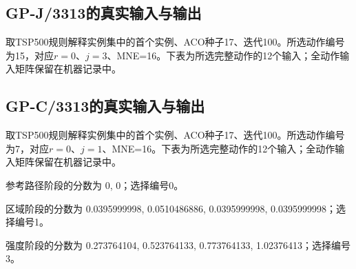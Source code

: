 \subsection{GP-J/3313的真实输入与输出}
取TSP500规则解释实例集中的首个实例、ACO种子17、迭代100。所选动作编号为15，对应$r=0$、$j=3$、MNE=16。下表为所选完整动作的12个输入；全动作输入矩阵保留在机器记录中。
\begin{center}\small{}\end{center}
\begin{center}\small{}\end{center}
\subsection{GP-C/3313的真实输入与输出}
取TSP500规则解释实例集中的首个实例、ACO种子17、迭代100。所选动作编号为7，对应$r=0$、$j=1$、MNE=16。下表为所选完整动作的12个输入；全动作输入矩阵保留在机器记录中。
\begin{center}\small{}\end{center}
参考路径阶段的分数为 0, 0；选择编号0。\par
区域阶段的分数为 0.0395999998, 0.0510486886, 0.0395999998, 0.0395999998；选择编号1。\par
强度阶段的分数为 0.273764104, 0.523764133, 0.773764133, 1.02376413；选择编号3。\par
